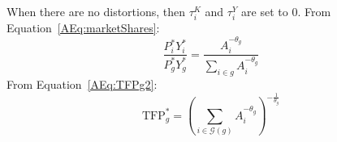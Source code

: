 \documentclass[12pt]{article}
\begin{document}
When there are no distortions, then $\tau_i^K$ and $\tau_i^Y$ are set to 0. From Equation~\eqref{AEq:marketShares}:
$$\frac{P_i^*Y_i^*}{P_g^*Y_g^*} = \frac{A_i^{-\theta_g}}{\sum_{i \in g}A_i^{-\theta_g}}$$
From Equation~\eqref{AEq:TFPg2}:
$$\text{TFP}_g^*=\left( \sum_{i \in \mathcal{G}(g)} A_i^{-\theta_g}  \right)^{-\frac{1}{\theta_g}}$$
%
%
\end{document}
